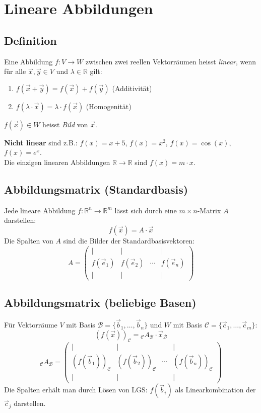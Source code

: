 \section{Lineare Abbildungen}

\subsection{Definition}
Eine Abbildung $f: V \to W$ zwischen zwei reellen Vektorräumen heisst \emph{linear}, wenn für alle $\vec{x}, \vec{y} \in V$ und $\lambda \in \mathbb{R}$ gilt:
\begin{enumerate}
    \item $f(\vec{x} + \vec{y}) = f(\vec{x}) + f(\vec{y})$ \quad (Additivität)
    \item $f(\lambda \cdot \vec{x}) = \lambda \cdot f(\vec{x})$ \quad (Homogenität)
\end{enumerate}
$f(\vec{x}) \in W$ heisst \emph{Bild} von $\vec{x}$.

\textbf{Nicht linear} sind z.B.: $f(x) = x + 5$, $f(x) = x^2$, $f(x) = \cos(x)$, $f(x) = e^x$.\\
Die einzigen linearen Abbildungen $\mathbb{R} \to \mathbb{R}$ sind $f(x) = m \cdot x$.

\subsection{Abbildungsmatrix (Standardbasis)}
Jede lineare Abbildung $f: \mathbb{R}^n \to \mathbb{R}^m$ lässt sich durch eine $m \times n$-Matrix $A$ darstellen:
$$f(\vec{x}) = A \cdot \vec{x}$$
Die Spalten von $A$ sind die Bilder der Standardbasisvektoren:
$$A = \begin{pmatrix} | & | & & | \\ f(\vec{e}_1) & f(\vec{e}_2) & \cdots & f(\vec{e}_n) \\ | & | & & | \end{pmatrix}$$

\subsection{Abbildungsmatrix (beliebige Basen)}
Für Vektorräume $V$ mit Basis $\mathcal{B} = \{\vec{b}_1, \ldots, \vec{b}_n\}$ und $W$ mit Basis $\mathcal{C} = \{\vec{c}_1, \ldots, \vec{c}_m\}$:
$$(f(\vec{x}))_\mathcal{C} = {}_\mathcal{C}A_\mathcal{B} \cdot \vec{x}_\mathcal{B}$$
$${}_\mathcal{C}A_\mathcal{B} = \begin{pmatrix} | & | & & | \\ (f(\vec{b}_1))_\mathcal{C} & (f(\vec{b}_2))_\mathcal{C} & \cdots & (f(\vec{b}_n))_\mathcal{C} \\ | & | & & | \end{pmatrix}$$
Die Spalten erhält man durch Lösen von LGS: $f(\vec{b}_i)$ als Linearkombination der $\vec{c}_j$ darstellen.

